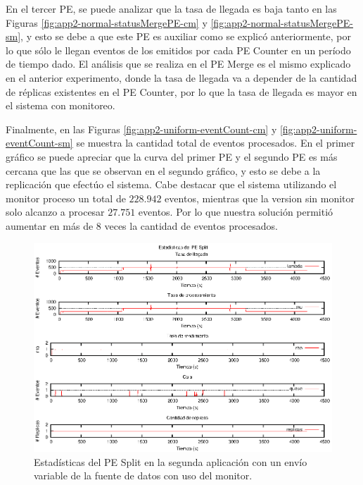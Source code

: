 En el tercer PE, se puede analizar que la tasa de llegada es baja tanto en las Figuras \ref{fig:app2-normal-statusMergePE-cm} y \ref{fig:app2-normal-statusMergePE-sm}, y esto se debe a que este PE es auxiliar como se explicó anteriormente, por lo que sólo le llegan eventos de los emitidos por cada PE Counter en un período de tiempo dado. El análisis que se realiza en el PE Merge es el mismo explicado en el anterior experimento, donde la tasa de llegada va a depender de la cantidad de réplicas existentes en el PE Counter, por lo que la tasa de llegada es mayor en el sistema con monitoreo.

Finalmente, en las Figuras \ref{fig:app2-uniform-eventCount-cm} y \ref{fig:app2-uniform-eventCount-sm} se muestra la cantidad total de eventos procesados. En el primer gráfico se puede apreciar que la curva del primer PE y el segundo PE es más cercana que las que se observan en el segundo gráfico, y esto se debe a la replicación que efectúo el sistema. Cabe destacar que el sistema utilizando el monitor proceso un total de $228.942$ eventos, mientras que la version sin monitor solo alcanzo a procesar $27.751$ eventos. Por lo que nuestra solución permitió aumentar en más de 8 veces la cantidad de eventos procesados.

\begin{figure}[p]
\centering
    \includegraphics[scale=1.1]{images/exp/app2/normal/cm/statusSplitPE.eps}
    \caption{Estadísticas del PE Split en la segunda aplicación con un envío variable de la fuente de datos con uso del monitor.}
    \label{fig:app2-normal-statusSplitPE-cm}
\end{figure}

